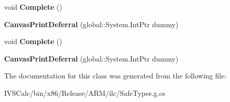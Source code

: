 \begin{DoxyCompactItemize}
void {\bfseries Complete} ()
\item 
\mbox{\label{class_microsoft_1_1_graphics_1_1_canvas_1_1_printing_1_1_canvas_print_deferral_a325061835bf65b956fa18eff323b5b28}} 
{\bfseries Canvas\+Print\+Deferral} (global\+::\+System.\+Int\+Ptr dummy)
\item 
\mbox{\label{class_microsoft_1_1_graphics_1_1_canvas_1_1_printing_1_1_canvas_print_deferral_abbc2d63ab3da836221b02bbf7c13718f}} 
void {\bfseries Complete} ()
\item 
\mbox{\label{class_microsoft_1_1_graphics_1_1_canvas_1_1_printing_1_1_canvas_print_deferral_a325061835bf65b956fa18eff323b5b28}} 
{\bfseries Canvas\+Print\+Deferral} (global\+::\+System.\+Int\+Ptr dummy)
\end{DoxyCompactItemize}


The documentation for this class was generated from the following file\+:\begin{DoxyCompactItemize}
\item 
I\+V\+S\+Calc/bin/x86/\+Release/\+A\+R\+M/ilc/Safe\+Types.\+g.\+cs\end{DoxyCompactItemize}
